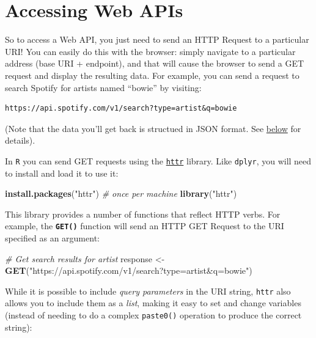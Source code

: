 \documentclass[]{book}
\newenvironment{Shaded}{\begin{snugshade}}{\end{snugshade}}
\newcommand{\KeywordTok}[1]{\textcolor[rgb]{0.13,0.29,0.53}{\textbf{#1}}}
\newcommand{\StringTok}[1]{\textcolor[rgb]{0.31,0.60,0.02}{#1}}
\newcommand{\CommentTok}[1]{\textcolor[rgb]{0.56,0.35,0.01}{\textit{#1}}}
\newcommand{\NormalTok}[1]{#1}
\theoremstyle{definition}
\theoremstyle{definition}
\theoremstyle{remark}
\begin{document}
\section{Accessing Web APIs}\label{accessing-web-apis}

So to access a Web API, you just need to send an HTTP Request to a
particular URI! You can easily do this with the browser: simply navigate
to a particular address (base URI + endpoint), and that will cause the
browser to send a GET request and display the resulting data. For
example, you can send a request to search Spotify for artists named
``bowie'' by visiting:

\begin{verbatim}
https://api.spotify.com/v1/search?type=artist&q=bowie
\end{verbatim}

(Note that the data you'll get back is structued in JSON format. See
\protect\hyperlink{json}{below} for details).

In \texttt{R} you can send GET requests using the
\href{https://cran.r-project.org/web/packages/httr/vignettes/quickstart.html}{\texttt{httr}}
library. Like \texttt{dplyr}, you will need to install and load it to
use it:

\begin{Shaded}
\begin{Highlighting}[]
\KeywordTok{install.packages}\NormalTok{(}\StringTok{"httr"}\NormalTok{)  }\CommentTok{# once per machine}
\KeywordTok{library}\NormalTok{(}\StringTok{"httr"}\NormalTok{)}
\end{Highlighting}
\end{Shaded}

This library provides a number of functions that reflect HTTP verbs. For
example, the \textbf{\texttt{GET()}} function will send an HTTP GET
Request to the URI specified as an argument:

\begin{Shaded}
\begin{Highlighting}[]
\CommentTok{# Get search results for artist}
\NormalTok{response <-}\StringTok{ }\KeywordTok{GET}\NormalTok{(}\StringTok{"https://api.spotify.com/v1/search?type=artist&q=bowie"}\NormalTok{)}
\end{Highlighting}
\end{Shaded}

While it is possible to include \emph{query parameters} in the URI
string, \texttt{httr} also allows you to include them as a \emph{list},
making it easy to set and change variables (instead of needing to do a
complex \texttt{paste0()} operation to produce the correct string):
\end{document}
